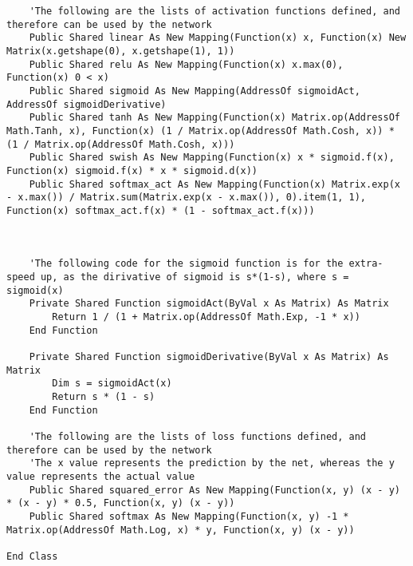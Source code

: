 \begin{verbatim}
    'The following are the lists of activation functions defined, and therefore can be used by the network
    Public Shared linear As New Mapping(Function(x) x, Function(x) New Matrix(x.getshape(0), x.getshape(1), 1))
    Public Shared relu As New Mapping(Function(x) x.max(0), Function(x) 0 < x)
    Public Shared sigmoid As New Mapping(AddressOf sigmoidAct, AddressOf sigmoidDerivative)
    Public Shared tanh As New Mapping(Function(x) Matrix.op(AddressOf Math.Tanh, x), Function(x) (1 / Matrix.op(AddressOf Math.Cosh, x)) * (1 / Matrix.op(AddressOf Math.Cosh, x)))
    Public Shared swish As New Mapping(Function(x) x * sigmoid.f(x), Function(x) sigmoid.f(x) * x * sigmoid.d(x))
    Public Shared softmax_act As New Mapping(Function(x) Matrix.exp(x - x.max()) / Matrix.sum(Matrix.exp(x - x.max()), 0).item(1, 1), Function(x) softmax_act.f(x) * (1 - softmax_act.f(x)))



    'The following code for the sigmoid function is for the extra-speed up, as the dirivative of sigmoid is s*(1-s), where s = sigmoid(x)
    Private Shared Function sigmoidAct(ByVal x As Matrix) As Matrix
        Return 1 / (1 + Matrix.op(AddressOf Math.Exp, -1 * x))
    End Function

    Private Shared Function sigmoidDerivative(ByVal x As Matrix) As Matrix
        Dim s = sigmoidAct(x)
        Return s * (1 - s)
    End Function

    'The following are the lists of loss functions defined, and therefore can be used by the network
    'The x value represents the prediction by the net, whereas the y value represents the actual value
    Public Shared squared_error As New Mapping(Function(x, y) (x - y) * (x - y) * 0.5, Function(x, y) (x - y))
    Public Shared softmax As New Mapping(Function(x, y) -1 * Matrix.op(AddressOf Math.Log, x) * y, Function(x, y) (x - y))

End Class
\end{verbatim}